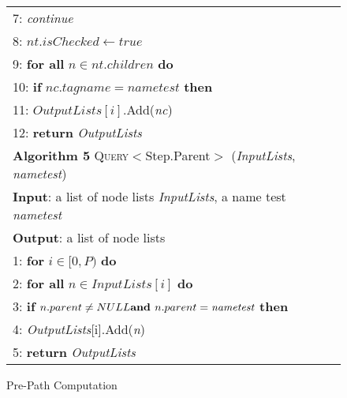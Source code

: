 \begin{figure}[t]
\begin{tabular}{l}
		7: \hspace{16 mm} \emph{continue} \\
		8: \hspace{12 mm} $nt.isChecked \leftarrow true$ \\
		9: \hspace{12 mm} \textbf{for all} $n \in nt.children$ \textbf{do} \\
		10: \hspace{16 mm} \textbf{if} $nc.tagname = nametest$ \textbf{then} \\
		11: \hspace{20 mm} $OutputLists[i]$.Add(\emph{nc}) \\
		12: \hspace{0 mm} \textbf{return} \emph{OutputLists} \\
		\hline
		\textbf{Algorithm 5} \textsc{Query}$<$Step.Parent$>$ (\emph{InputLists}, \emph{nametest}) \\
		\hline
		\textbf{Input}: a list of node lists \emph{InputLists}, a name test \emph{nametest} \\
		\textbf{Output}: a list of node lists  \\
		1: \hspace{1 mm} \textbf{for} $i \in [0, P)$ \textbf{do} \\
		2: \hspace{4 mm} \textbf{for all} $n \in InputLists[i]$ \textbf{do} \\
		3: \hspace{8 mm} \textbf{if} $n.parent \neq NULL \textbf{and } n.parent = \emph{nametest}$ \textbf{then} \\
		4: \hspace{12 mm} \emph{OutputLists}[i].Add(\emph{n}) \\
		5: \hspace{0 mm} \textbf{return} \emph{OutputLists} \\
		\hline
	\end{tabular}
	\caption{Pre-Path Computation}
\end{figure}

